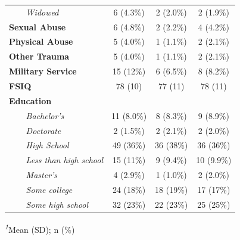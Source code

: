 \begin{table}[t]
\begin{tabular*}{\linewidth}{@{\extracolsep{\fill}}lccc}
{\itshape     Widowed} & 6 (4.3\%) & 2 (2.0\%) & 2 (1.9\%) \\ 
{\bfseries Sexual Abuse} & 6 (4.8\%) & 2 (2.2\%) & 4 (4.2\%) \\ 
{\bfseries Physical Abuse} & 5 (4.0\%) & 1 (1.1\%) & 2 (2.1\%) \\ 
{\bfseries Other Trauma} & 5 (4.0\%) & 1 (1.1\%) & 2 (2.1\%) \\ 
{\bfseries Military Service} & 15 (12\%) & 6 (6.5\%) & 8 (8.2\%) \\ 
{\bfseries FSIQ} & 78 (10) & 77 (11) & 78 (11) \\ 
{\bfseries Education} &  &  &  \\ 
{\itshape     Bachelor's} & 11 (8.0\%) & 8 (8.3\%) & 9 (8.9\%) \\ 
{\itshape     Doctorate} & 2 (1.5\%) & 2 (2.1\%) & 2 (2.0\%) \\ 
{\itshape     High School} & 49 (36\%) & 36 (38\%) & 36 (36\%) \\ 
{\itshape     Less than high school} & 15 (11\%) & 9 (9.4\%) & 10 (9.9\%) \\ 
{\itshape     Master's} & 4 (2.9\%) & 1 (1.0\%) & 2 (2.0\%) \\ 
{\itshape     Some college} & 24 (18\%) & 18 (19\%) & 17 (17\%) \\ 
{\itshape     Some high school} & 32 (23\%) & 22 (23\%) & 25 (25\%) \\ 
\bottomrule
\end{tabular*}
\begin{minipage}{\linewidth}
\textsuperscript{\textit{1}}Mean (SD); n (\%)\\
\end{minipage}
\end{table}

